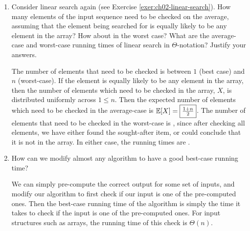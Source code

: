 \documentclass[Chapter02]{subfiles}
\begin{document}
\begin{enumerate}[leftmargin=\labelsep]
		\item Consider linear search again (see Exercise \ref{exer:ch02-linear-search}). How many elements of the input sequence need to be checked on the average, assuming that the element being searched for is equally likely to be any element in the array? How about in the worst case? What are the average-case and worst-case running times of linear search in $\Theta$-notation? Justify your answers.
		\begin{answer}
			The number of elements that need to be checked is between $1$ (best case) and $n$ (worst-case). If the element is equally likely to be any element in the array, then the number of elements which need to be checked in the array, $X$, is distributed uniformly across $1 \leq n$. Then the expected number of elements which need to be checked in the average-case is $\mathbb{E}[X] = \fbox{$\frac{1 + n}{2}$}$. The number of elements that need to be checked in the worst-case is , since after checking all elements, we have either found the sought-after item, or could conclude that it is not in the array. In either case, the running times are .
		\end{answer}

		\item How can we modify almost any algorithm to have a good best-case running time?
		\begin{answer}
			We can simply pre-compute the correct output for some set of inputs, and modify our algorithm to first check if our input is one of the pre-computed ones. Then the best-case running time of the algorithm is simply the time it takes to check if the input is one of the pre-computed ones. For input structures such as arrays, the running time of this check is $\Theta(n)$.
		\end{answer}

	\end{enumerate}
\end{document}
